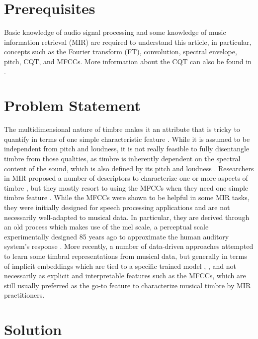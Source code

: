 \documentclass[journal]{IEEEtran}
\begin{document}
\section{Prerequisites}

Basic knowledge of audio signal processing and some knowledge of music information retrieval (MIR) \cite{mueller2007} are required to understand this article, in particular, concepts such as the Fourier transform (FT), convolution, spectral envelope, pitch, CQT, and MFCCs. More information about the CQT can also be found in \cite{brown1991, brown1992}.


\section{Problem Statement}

The multidimensional nature of timbre makes it an attribute that is tricky to quantify in terms of one simple characteristic feature \cite{grey1977}. While it is assumed to be independent from pitch and loudness, it is not really feasible to fully disentangle timbre from those qualities, as timbre is inherently dependent on the spectral content of the sound, which is also defined by its pitch and loudness \cite{moore2004}. Researchers in MIR proposed a number of descriptors to characterize one or more aspects of timbre \cite{peeters2011}, but they mostly resort to using the MFCCs when they need one simple timbre feature \cite{mueller2007}. While the MFCCs were shown to be helpful in some MIR tasks, they were initially designed for speech processing applications \cite{mermelstein1976} and are not necessarily well-adapted to musical data. In particular, they are derived through an old process which makes use of the mel scale, a perceptual scale experimentally designed 85 years ago to approximate the human auditory system's response \cite{stevens1937}. More recently, a number of data-driven approaches attempted to learn some timbral representations from musical data, but generally in terms of implicit embeddings which are tied to a specific trained model \cite{engel2017}, \cite{pons2017}, and not necessarily as explicit and interpretable features such as the MFCCs, which are still usually preferred as the go-to feature to characterize musical timbre by MIR practitioners.


\section{Solution}
\end{document}
